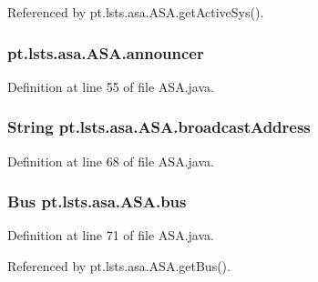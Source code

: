 Referenced by pt.\+lsts.\+asa.\+A\+S\+A.\+get\+Active\+Sys().

\hypertarget{classpt_1_1lsts_1_1asa_1_1ASA_a09a7fbc6fa8123eaea605bbece39554b}{}
\subsubsection[{announcer}]{ pt.\+lsts.\+asa.\+A\+S\+A.\+announcer\hspace{0.3cm}{\ttfamily [static]}}\label{classpt_1_1lsts_1_1asa_1_1ASA_a09a7fbc6fa8123eaea605bbece39554b}


Definition at line 55 of file A\+S\+A.\+java.

\hypertarget{classpt_1_1lsts_1_1asa_1_1ASA_aa9bbbbc42eb2b87d06a8a6cf3fcc7c96}{}
\subsubsection[{broadcast\+Address}]{\setlength{\rightskip}{0pt plus 5cm}String pt.\+lsts.\+asa.\+A\+S\+A.\+broadcast\+Address}\label{classpt_1_1lsts_1_1asa_1_1ASA_aa9bbbbc42eb2b87d06a8a6cf3fcc7c96}


Definition at line 68 of file A\+S\+A.\+java.

\hypertarget{classpt_1_1lsts_1_1asa_1_1ASA_a3b1468022b12779c73e5d8bb41e39f8e}{}
\subsubsection[{bus}]{\setlength{\rightskip}{0pt plus 5cm}Bus pt.\+lsts.\+asa.\+A\+S\+A.\+bus\hspace{0.3cm}{\ttfamily [private]}}\label{classpt_1_1lsts_1_1asa_1_1ASA_a3b1468022b12779c73e5d8bb41e39f8e}


Definition at line 71 of file A\+S\+A.\+java.



Referenced by pt.\+lsts.\+asa.\+A\+S\+A.\+get\+Bus().

